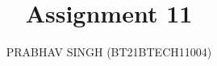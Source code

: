 \documentclass[journal,12pt,twocolumn]{IEEEtran}
\begin{document}
		
		\title{
			Assignment 11
		}
		\author{ PRABHAV SINGH (BT21BTECH11004)%
		}	
% 
\end{document}
